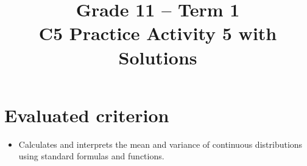 
\makeatletter
{}
\makeatother






\usepackage{longtable}


\setlength{\DistributionGraphWidth}{0.6\textwidth}
\setlength{\DistributionGraphHeight}{6cm}

\setlength{\DistributionGraphHeightCompact}{3.5cm}

\title{Grade 11 -- Term 1 \\ C5 Practice Activity 5 with Solutions}
\author{}
\date{}

\pagestyle{empty}


\newcommand{\SolvedGraph}[2]{%
	\par\smallskip
	\Needspace{4.6cm}%
	\begin{center}
		\textbf{\small #1}\par\vspace{-1mm}
		\begin{minipage}{\textwidth}
			#2
		\end{minipage}%
	\end{center}
	\vspace{-2mm}%
}

\newcommand{\SolutionStage}[2]{%
	\Needspace{6\baselineskip}%
	\subsubsection{#2}%
}



	\maketitle
	\setcounter{tocdepth}{1}
	\setcounter{secnumdepth}{2}
	\label{toc}
	\vspace*{-20mm}
	\tableofcontents
	
	\section*{Evaluated criterion}
	\begin{itemize}
		\item [\textbf{C5.}] Calculates and interprets the mean and variance of continuous distributions using standard formulas and functions.
	\end{itemize}
	
